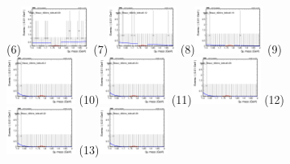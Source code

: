 \begin{figure}[h!]
        \subfigure(6){\includegraphics[width=0.2\textwidth]{unfixed_exp/plots/taue/massfit_taue_40bins_bdtcut0.08.png}}
        \subfigure(7){\includegraphics[width=0.2\textwidth]{unfixed_exp/plots/taue/massfit_taue_40bins_bdtcut0.12.png}}
        \subfigure(8){\includegraphics[width=0.2\textwidth]{unfixed_exp/plots/taue/massfit_taue_40bins_bdtcut0.16.png}}
        \subfigure(9){\includegraphics[width=0.2\textwidth]{unfixed_exp/plots/taue/massfit_taue_40bins_bdtcut0.2.png}}
        \subfigure(10){\includegraphics[width=0.2\textwidth]{unfixed_exp/plots/taue/massfit_taue_40bins_bdtcut0.24.png}}
        \subfigure(11){\includegraphics[width=0.2\textwidth]{unfixed_exp/plots/taue/massfit_taue_40bins_bdtcut0.28.png}}
        \subfigure(12){\includegraphics[width=0.2\textwidth]{unfixed_exp/plots/taue/massfit_taue_40bins_bdtcut0.32.png}}
        \subfigure(13){\includegraphics[width=0.2\textwidth]{unfixed_exp/plots/taue/massfit_taue_40bins_bdtcut0.36.png}}

\end{figure}
